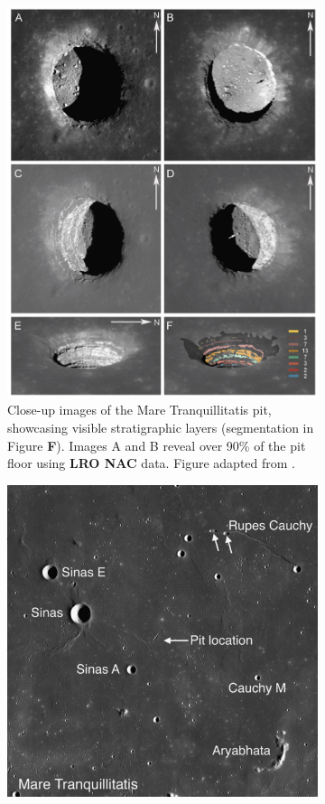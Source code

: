 \begin{figure}[h!]
    \centering
    \begin{subfigure}[c]{0.59\linewidth}
        \centering
        \includegraphics[width=0.9\linewidth]{lunar-pits-with-layers.png}
        \caption{Close-up images of the Mare Tranquillitatis pit, showcasing visible stratigraphic layers (segmentation in Figure \textbf{F}). Images A and B reveal over 90\% of the pit floor using \textbf{LRO NAC} data. Figure adapted from \cite{sublunear-lava}.}
        \label{fig:image1}
    \end{subfigure}
    \hfill
    \begin{subfigure}[c]{0.4\linewidth}
        \centering
        \includegraphics[width=0.9\linewidth]{Lunar_Pit_layers_2pic_location.png}

\end{subfigure}
\end{figure}

